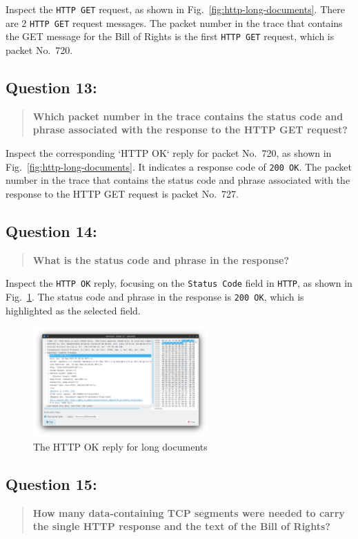 \documentclass{cshwk}
\begin{document}
Inspect the \texttt{HTTP GET} request, as shown in Fig.~\ref{fig:http-long-documents}. There are 2 \texttt{HTTP GET} request messages. The packet number in the trace that contains the GET message for the Bill of Rights is the first \texttt{HTTP GET} request, which is packet No.~720.

\subsection*{Question 13:}
\begin{quote}
    \textbf{Which packet number in the trace contains the status code and phrase associated with the response to the HTTP GET request?}
\end{quote}

Inspect the corresponding `HTTP OK` reply for packet No.~720, as shown in Fig.~\ref{fig:http-long-documents}. It indicates a response code of \texttt{200 OK}. The packet number in the trace that contains the status code and phrase associated with the response to the HTTP GET request is packet No.~727.

\subsection*{Question 14:}
\begin{quote}
    \textbf{What is the status code and phrase in the response?}
\end{quote}
Inspect the \texttt{HTTP OK} reply, focusing on the \texttt{Status Code} field in \texttt{HTTP}, as shown in Fig.~\ref{fig:http-long-documents-response}. The status code and phrase in the response is \texttt{200 OK}, which is highlighted as the selected field.
\begin{figure}[htbp]
    \centering
    \includegraphics[width=0.6\textwidth]{lab2-10.png}
    \caption{The HTTP OK reply for long documents}
    \label{fig:http-long-documents-response}
\end{figure}

\subsection*{Question 15:}
\begin{quote}
    \textbf{How many data-containing TCP segments were needed to carry the single HTTP response and the text of the Bill of Rights?}
\end{quote}
\end{document}
